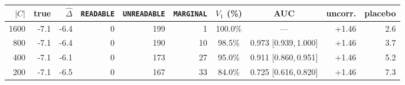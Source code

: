 \setlength{\tabcolsep}{3.2pt}\begin{tabular}{rrrrrrccrr}
\toprule
$|C|$ & true & $\hat\Delta$ & \texttt{READABLE} & \texttt{UNREADABLE} &
\texttt{MARGINAL} & $V_1$ (\%) & AUC & uncorr. & placebo \\
\midrule
1600 & -7.1 & -6.4 & 0 & 199 & 1 & 100.0\% & --- & +1.46 & 2.6 \\
800 & -7.1 & -6.4 & 0 & 190 & 10 & 98.5\% & 0.973 [0.939,\,1.000] & +1.46 & 3.7 \\
400 & -7.1 & -6.1 & 0 & 173 & 27 & 95.0\% & 0.911 [0.860,\,0.951] & +1.46 & 5.2 \\
200 & -7.1 & -6.5 & 0 & 167 & 33 & 84.0\% & 0.725 [0.616,\,0.820] & +1.46 & 7.3 \\
\bottomrule
\end{tabular}
